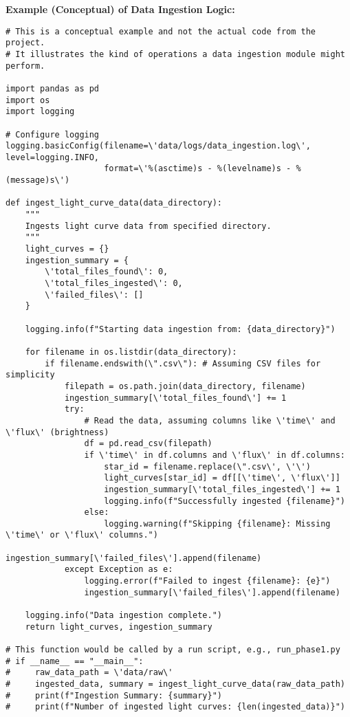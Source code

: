\documentclass{article}
\begin{document}
\textbf{Example (Conceptual) of Data Ingestion Logic:}
\begin{lstlisting}[caption={Conceptual Data Ingestion Logic}]
# This is a conceptual example and not the actual code from the project.
# It illustrates the kind of operations a data ingestion module might perform.

import pandas as pd
import os
import logging

# Configure logging
logging.basicConfig(filename=\'data/logs/data_ingestion.log\', level=logging.INFO,
                    format=\'%(asctime)s - %(levelname)s - %(message)s\')

def ingest_light_curve_data(data_directory):
    """
    Ingests light curve data from specified directory.
    """
    light_curves = {}
    ingestion_summary = {
        \'total_files_found\': 0,
        \'total_files_ingested\': 0,
        \'failed_files\': []
    }

    logging.info(f"Starting data ingestion from: {data_directory}")

    for filename in os.listdir(data_directory):
        if filename.endswith(\".csv\"): # Assuming CSV files for simplicity
            filepath = os.path.join(data_directory, filename)
            ingestion_summary[\'total_files_found\'] += 1
            try:
                # Read the data, assuming columns like \'time\' and \'flux\' (brightness)
                df = pd.read_csv(filepath)
                if \'time\' in df.columns and \'flux\' in df.columns:
                    star_id = filename.replace(\".csv\', \'\')
                    light_curves[star_id] = df[[\'time\', \'flux\']]
                    ingestion_summary[\'total_files_ingested\'] += 1
                    logging.info(f"Successfully ingested {filename}")
                else:
                    logging.warning(f"Skipping {filename}: Missing \'time\' or \'flux\' columns.")
                    ingestion_summary[\'failed_files\'].append(filename)
            except Exception as e:
                logging.error(f"Failed to ingest {filename}: {e}")
                ingestion_summary[\'failed_files\'].append(filename)

    logging.info("Data ingestion complete.")
    return light_curves, ingestion_summary

# This function would be called by a run script, e.g., run_phase1.py
# if __name__ == "__main__":
#     raw_data_path = \'data/raw\'
#     ingested_data, summary = ingest_light_curve_data(raw_data_path)
#     print(f"Ingestion Summary: {summary}")
#     print(f"Number of ingested light curves: {len(ingested_data)}")
\end{lstlisting}
\end{document}
